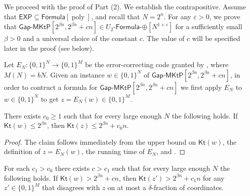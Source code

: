 \documentclass{toc}
\DeclareMathOperator{\poly}{poly} %
\newcommand{\gapmktp}{\mathsf{Gap}$-$\mathsf{MKtP}}
\newcommand{\Kt}{\mathsf{Kt}}
\begin{document}
We proceed with the proof of  Part (2). We establish the contrapositive. Assume that $\mathsf{EXP} \subseteq \mathsf{Formula}[\poly]$, and recall that $N = 2^n$. For any  $\varepsilon > 0$, we prove that $\gapmktp[2^{\beta n}, 2^{\beta n} + cn] \in U_2$-$\mathsf{Formula}$-$\oplus[N^{1 + \varepsilon}]$ for a sufficiently small $\beta > 0$ and a universal choice of the constant $c$. The value of $c$ will be specified later in the proof (see  below).


Let $E_N \colon \{0,1\}^N \to \{0,1\}^M$ be the error-correcting code granted by , where $M(N) = bN$. Given an instance $w \in \{0,1\}^N$ of $\gapmktp[2^{\beta n}, 2^{\beta n} + cn]$, in order to contruct a formula for $\gapmktp[2^{\beta n}, 2^{\beta n} + cn]$ we first apply $E_N$ to $w \in \{0,1\}^N$ to get $z = E_N(w) \in \{0,1\}^M$. 

\begin{claim}\label{cl:Kt1}
There exists $c_0 \geq 1$ such that for every large enough $N$ the following holds.
If $\Kt(w) \leq 2^{\beta n}$, then $\Kt(z) \leq 2^{\beta n} + c_0 n$.
\end{claim}

\begin{proof}
The claim follows immediately from the upper bound on $\Kt(w)$, the definition of $z = E_N(w)$, the running time of $E_N$, and .
\end{proof}

\begin{claim}\label{cl:Kt2}
For each $c_1>c_0$ there exists $c>c_1$ 
such that for every large enough $N$ the following holds.
If $\Kt(w) > 2^{\beta n} + c n$, then $\Kt(z') > 2^{\beta n} + c_1 n$ for any $z' \in \{0,1\}^M$ that disagrees with $z$ on at most a $\delta$-fraction of coordinates.
\end{claim}
\end{document}

